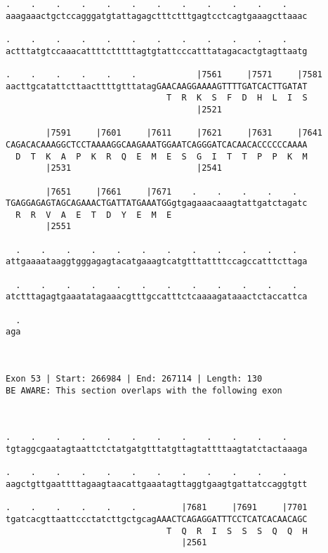 \documentclass{article}
\begin{document}
\begin{Verbatim}
.    .    .    .    .    .    .    .    .    .    .    .    
aaagaaactgctccagggatgtattagagctttctttgagtcctcagtgaaagcttaaac
                                                            
.    .    .    .    .    .    .    .    .    .    .    .    
actttatgtccaaacattttctttttagtgtattcccatttatagacactgtagttaatg
                                                            
.    .    .    .    .    .            |7561     |7571     |7581
aacttgcatattcttaacttttgtttatagGAACAAGGAAAAGTTTTGATCACTTGATAT
                                T  R  K  S  F  D  H  L  I  S
                                      |2521                 
  
        |7591     |7601     |7611     |7621     |7631     |7641
CAGACACAAAGGCTCCTAAAAGGCAAGAAATGGAATCAGGGATCACAACACCCCCCAAAA
  D  T  K  A  P  K  R  Q  E  M  E  S  G  I  T  T  P  P  K  M
        |2531                         |2541                 
  
        |7651     |7661     |7671    .    .    .    .    .  
TGAGGAGAGTAGCAGAAACTGATTATGAAATGGgtgagaaacaaagtattgatctagatc
  R  R  V  A  E  T  D  Y  E  M  E                           
        |2551                                               
  
  .    .    .    .    .    .    .    .    .    .    .    .  
attgaaaataaggtgggagagtacatgaaagtcatgtttattttccagccatttcttaga
                                                            
  .    .    .    .    .    .    .    .    .    .    .    .  
atctttagagtgaaatatagaaacgtttgccatttctcaaaagataaactctaccattca
                                                            
  .
aga
   
   
 
Exon 53 | Start: 266984 | End: 267114 | Length: 130
BE AWARE: This section overlaps with the following exon



.    .    .    .    .    .    .    .    .    .    .    .    
tgtaggcgaatagtaattctctatgatgtttatgttagtattttaagtatctactaaaga
                                                            
.    .    .    .    .    .    .    .    .    .    .    .    
aagctgttgaattttagaagtaacattgaaatagttaggtgaagtgattatccaggtgtt
                                                            
.    .    .    .    .    .         |7681     |7691     |7701
tgatcacgttaattccctatcttgctgcagAAACTCAGAGGATTTCCTCATCACAACAGC
                                T  Q  R  I  S  S  S  Q  Q  H
                                   |2561                    
  

\end{Verbatim}
\end{document}
